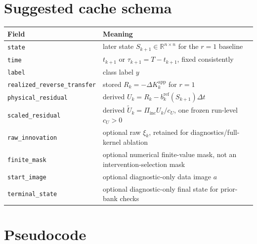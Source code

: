 \documentclass[11pt]{article}
\numberwithin{equation}{section}
\newcommand{\R}{\mathbb R}
\newcommand{\1}{\mathbf 1}
\begin{document}
\section{Suggested cache schema}

\begin{center}
\begin{tabular}{@{}p{}p{}@{}}
\toprule
Field & Meaning \\
\midrule
\texttt{state} & later state \(S_{k+1}\in\R^{n\times n}\) for the \(r=1\) baseline \\
\texttt{time} & \(t_{k+1}\) or \(\tau_{k+1}=T-t_{k+1}\), fixed consistently \\
\texttt{label} & class label \(y\) \\
\texttt{realized\_reverse\_transfer} & stored \(R_k=-\Delta K_k^{\mathrm{app}}\) for \(r=1\) \\
\texttt{physical\_residual} & derived \(U_k=R_k-b_k^{\mathrm{ref}}(S_{k+1})\Delta t\) \\
\texttt{scaled\_residual} & derived \(\widetilde U_k=\Pi_{\mathrm{inc}}U_k/c_U\), one frozen run-level \(c_U>0\) \\
\texttt{raw\_innovation} & optional raw \(\xi_k\), retained for diagnostics/full-kernel ablation \\
\texttt{finite\_mask} & optional numerical finite-value mask, not an intervention-selection mask \\
\texttt{start\_image} & optional diagnostic-only data image \(a\) \\
\texttt{terminal\_state} & optional diagnostic-only final state for prior-bank checks \\
\bottomrule
\end{tabular}
\end{center}

\section{Pseudocode}
\end{document}
